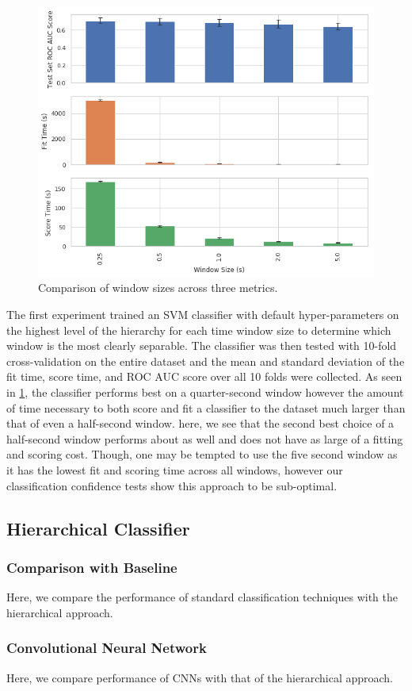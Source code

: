 \begin{figure}[h]
    \centering
    \includegraphics[width=.48\textwidth]{figures/ROC-AUC-Window-Compare.png}
    \caption{Comparison of window sizes across three metrics.}
    \label{fig:roc-auc-window}
\end{figure}

The first experiment trained an SVM classifier with default hyper-parameters on the highest level of the hierarchy for each time window size to determine which window is the most clearly separable. The classifier was then tested with 10-fold cross-validation on the entire dataset and the mean and standard deviation of the fit time, score time, and ROC AUC score over all 10 folds were collected. As seen in \cref{fig:roc-auc-window}, the classifier performs best on a quarter-second window however the amount of time necessary to both score and fit a classifier to the dataset much larger than that of even a half-second window. here, we see that the second best choice of a half-second window performs about as well and does not have as large of a fitting and scoring cost. Though, one may be tempted to use the five second window as it has the lowest fit and scoring time across all windows, however our classification confidence tests show this approach to be sub-optimal.

\subsection{Hierarchical Classifier}

\subsubsection{Comparison with Baseline}
Here, we compare the performance of standard classification techniques with the hierarchical approach.

\subsubsection{Convolutional Neural Network}
Here, we compare performance of CNNs with that of the hierarchical approach.


